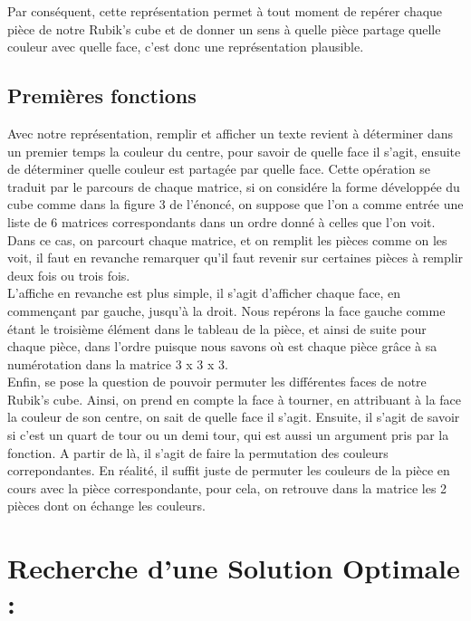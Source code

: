 \documentclass[a4paper,11pt]{article}
\theoremstyle{mytheor}
\begin{document}
Par conséquent, cette représentation permet à tout moment de repérer chaque pièce de notre Rubik's cube et de donner un sens à quelle pièce partage quelle couleur avec quelle face, c'est donc une représentation plausible.


\subsection{Premières fonctions}

Avec notre représentation, remplir et afficher un texte revient à déterminer dans un premier temps la couleur du centre, pour savoir de quelle face il s'agit, ensuite de déterminer quelle couleur est partagée par quelle face. Cette opération se traduit par le parcours de chaque matrice, si on considére la forme développée du cube comme dans la figure 3 de l'énoncé, on suppose que l'on a comme entrée une liste de 6 matrices correspondants dans un ordre donné à celles que l'on voit. Dans ce cas, on parcourt chaque matrice, et on remplit les pièces comme on les voit, il faut en revanche remarquer qu'il faut revenir sur certaines pièces à remplir deux fois ou trois fois. 
\\
L'affiche en revanche est plus simple, il s'agit d'afficher chaque face, en commençant par gauche, jusqu'à la droit. Nous repérons la face gauche comme étant le troisième élément dans le tableau de la pièce, et ainsi de suite pour chaque pièce, dans l'ordre puisque nous savons où est chaque pièce grâce à sa numérotation dans la matrice 3 x 3 x 3.
\\
Enfin, se pose la question de pouvoir permuter les différentes faces de notre Rubik's cube. Ainsi, on prend en compte la face à tourner, en attribuant à la face la couleur de son centre, on sait de quelle face il s'agit. Ensuite, il s'agit de savoir si c'est un quart de tour ou un demi tour, qui est aussi un argument pris par la fonction. A partir de là, il s'agit de faire la permutation des couleurs correpondantes. En réalité, il suffit juste de permuter les couleurs de la pièce en cours avec la pièce correspondante, pour cela, on retrouve dans la matrice les 2 pièces dont on échange les couleurs.




\section{Recherche d'une Solution Optimale :}
\end{document}
